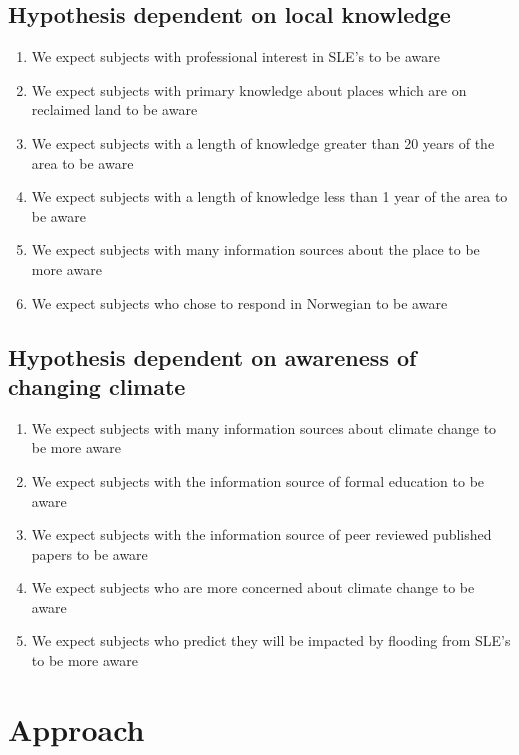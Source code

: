 \subsection{Hypothesis dependent on local knowledge}
\begin{enumerate}
    \item We expect subjects with professional interest in SLE's to be aware
    \item We expect subjects with primary knowledge about places which are on reclaimed land to be aware
    \item We expect subjects with a length of knowledge greater than 20 years of the area to be aware
    \item We expect subjects with a length of knowledge less than 1 year of the area to be aware
    \item We expect subjects with many information sources about the place to be more aware
    \item We expect subjects who chose to respond in Norwegian to be aware
\end{enumerate}
\paragraph{}

\subsection{Hypothesis dependent on awareness of changing climate}
\begin{enumerate}
    \item We expect subjects with many information sources about climate change to be more aware
    \item We expect subjects with the information source of formal education to be aware
    \item We expect subjects with the information source of peer reviewed published papers to be aware
    \item We expect subjects who are more concerned about climate change to be aware
    \item We expect subjects who predict they will be impacted by flooding from SLE's to be more aware
\end{enumerate}



\section{Approach}

